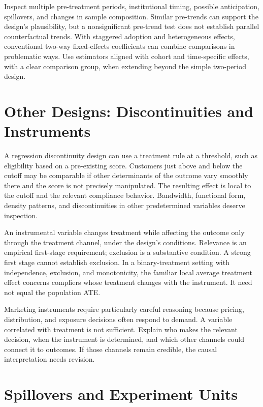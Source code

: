 Inspect multiple pre-treatment periods, institutional timing, possible
anticipation, spillovers, and changes in sample composition. Similar
pre-trends can support the design's plausibility, but a nonsignificant
pre-trend test does not establish parallel counterfactual trends. With
staggered adoption and heterogeneous effects, conventional two-way
fixed-effects coefficients can combine comparisons in problematic ways.
Use estimators aligned with cohort and time-specific effects, with a
clear comparison group, when extending beyond the simple two-period
design.

\hypertarget{M06-other-designs-discontinuities-and-instruments}{%
\section{Other Designs: Discontinuities and
Instruments}\label{M06-other-designs-discontinuities-and-instruments}}

\noindent A regression discontinuity design can use a treatment rule at a
threshold, such as eligibility based on a pre-existing score. Customers
just above and below the cutoff may be comparable if other determinants
of the outcome vary smoothly there and the score is not precisely
manipulated. The resulting effect is local to the cutoff and the
relevant compliance behavior. Bandwidth, functional form, density
patterns, and discontinuities in other predetermined variables deserve
inspection.

An instrumental variable changes treatment while affecting the outcome
only through the treatment channel, under the design's conditions.
Relevance is an empirical first-stage requirement; exclusion is a
substantive condition. A strong first stage cannot establish exclusion.
In a binary-treatment setting with independence, exclusion, and
monotonicity, the familiar local average treatment effect concerns
compliers whose treatment changes with the instrument. It need not equal
the population ATE.

Marketing instruments require particularly careful reasoning because
pricing, distribution, and exposure decisions often respond to demand. A
variable correlated with treatment is not sufficient. Explain who makes
the relevant decision, when the instrument is determined, and which
other channels could connect it to outcomes. If those channels remain
credible, the causal interpretation needs revision.

\hypertarget{M06-spillovers-and-experiment-units}{%
\section{Spillovers and Experiment
Units}\label{M06-spillovers-and-experiment-units}}

